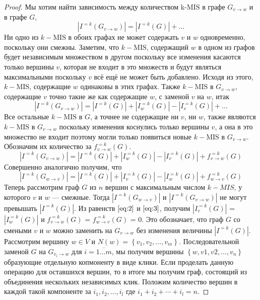 \documentclass[12pt]{article}
\begin{document}
\begin{proof}
	Мы хотим найти зависимость между количеством k-$\text{MIS}$ в графе $G_{v\to w}$ и в графе $G$,
	$$\left| I^{=k}\left(G_{v \to w}\right) \right| = \left| I^{=k}\left(G\right) \right| + \dots$$ 
	Ни одно из $k-\text{MIS}$ в обоих графах не может содержать $v$ и $w$ одновременно, поскольку они смежны. Заметим, что $k-\text{MIS}$, содержащий $w$ в одном из графов будет независимым множеством в другом поскольку все изменения касаются только вершины $v$, которая не входит в это множеств и будут являться максимальными поскольку $v$ всё ещё не может быть добавлено. Исходя из этого, $k-\text{MIS}$, содержащие $w$ одинаковы в этих графах. Также $k-\text{MIS}$ в $G_{v \to w}$, содержащие $v$ точно такие же как содержащие $w$, с заменой $v$ на $w$, итак
	$$\left| I^{=k}\left(G_{v \to w}\right) \right| = \left| I^{=k}\left(G\right) \right| + \left| I^{=k}_w\left(G\right) \right| - \left|I^{=k}_v\left(G\right)\right| + \dots$$
	Все остальные $k-\text{MIS}$ в $G$, а точнее не содержащие ни $v$, ни $w$, также являются $k-\text{MIS}$ в $G_{v \to w}$ поскольку изменения коснулись только вершины $v$, а она в это множество не входит поэтому могли только появиться новые $k-\text{MIS}$ в $G_{v \to w}$. Обозначим их количество за $f^{=k}_{v \to w}\left(G\right)$.
	\begin{equation}\label{eq:2}
	    \left| I^{=k}\left(G_{v \to w}\right) \right| = \left| I^{=k}\left(G\right) \right| + \left| I^{=k}_w\left(G\right) \right| - \left|I^{=k}_v\left(G\right)\right| + f^{=k}_{v \to w}\left(G\right)
	\end{equation}
	Совершенно аналогично получим, что 
	\begin{equation}\label{eq:3}
	    \left| I^{=k}\left(G_{w \to v}\right) \right| = \left| I^{=k}\left(G\right) \right| + \left| I^{=k}_v\left(G\right) \right| - \left|I^{=k}_w\left(G\right)\right| + f^{=k}_{w \to v}\left(G\right)
	\end{equation}
	Теперь рассмотрим граф $G$ из $n$ вершин с максимальным числом $k-MIS$, у которого $v$ и $w$ --- смежные. Тогда $\left| I^{=k}\left(G_{w \to v}\right) \right|$ и $\left| I^{=k}\left(G_{v \to w}\right) \right|$ не могут превышать $\left| I^{=k}\left(G\right) \right|$. Из равенств $\eqref{eq:2}$ и $\eqref{eq:3}$, получим $\left| I^{=k}_v\left(G\right) \right|$ = $\left|I^{=k}_w\left(G\right)\right|$ и $f^{=k}_{v \to w}\left(G\right)$ = $f^{=k}_{w \to v}\left(G\right)$ = 0. Это обозначает, что граф $G$ со смеными $v$ и $w$ можно заменить на $G_{v \to w}$ без изменения величины $\left| I^{=k}\left(G\right) \right|$. Рассмотрим вершину $w \in V$ и $N\left(w\right) = \left\{v_1, v_2, \dots, v_m \right\}$. Последовательной заменой $G$ на $G_{v_i \to w}$ для $i = \overline{1...m}$, мы получим вершины $\left\{w, v1, v2, \dots, v_n\right\}$ образующие отдельную копмоненту в виде клики. Если проделать данную операцию для оставшихся вершин, то в итоге мы получим граф, состоящий из объединения нескольких независимых клик. Положим количество вершин в каждой такой компоненте за $i_1, i_2, \dots, i_l$ где $i_1 + i_2 + \cdots + i_l = n$.

\end{proof}
\end{document}
